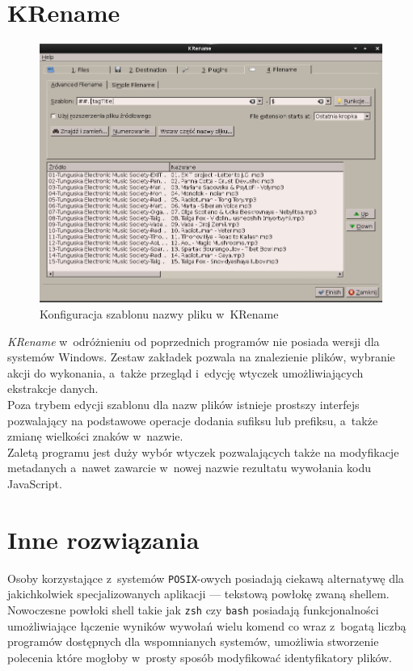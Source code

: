 \section{KRename}
\begin{figure}[h]
\begin{center}
\includegraphics[scale=0.55]{img/krename_window.png}
\end{center}
\caption{Konfiguracja szablonu nazwy pliku w~KRename}
\end{figure}

\par
\textit{KRename} w~odróżnieniu od poprzednich programów nie posiada wersji dla systemów Windows. Zestaw zakładek pozwala na znalezienie plików, wybranie akcji do wykonania, a~także przegląd i~edycję wtyczek umożliwiających ekstrakcje danych.\\
Poza trybem edycji szablonu dla nazw plików istnieje prostszy interfejs pozwalający na podstawowe operacje dodania sufiksu lub prefiksu, a~także zmianę wielkości znaków w~nazwie.\\
Zaletą programu jest duży wybór wtyczek pozwalających także na modyfikacje metadanych a~nawet zawarcie w~nowej nazwie rezultatu wywołania kodu JavaScript.

\section{Inne rozwiązania}
\par
Osoby korzystające z~systemów \texttt{POSIX}-owych posiadają ciekawą alternatywę dla jakichkolwiek specjalizowanych aplikacji --- tekstową powłokę zwaną shellem.\\
Nowoczesne powłoki shell takie jak \texttt{zsh} czy \texttt{bash} posiadają funkcjonalności umożliwiające łączenie wyników wywołań wielu komend co wraz z~bogatą liczbą programów dostępnych dla wspomnianych systemów, umożliwia stworzenie polecenia które mogłoby w~prosty sposób modyfikować identyfikatory plików.\\


